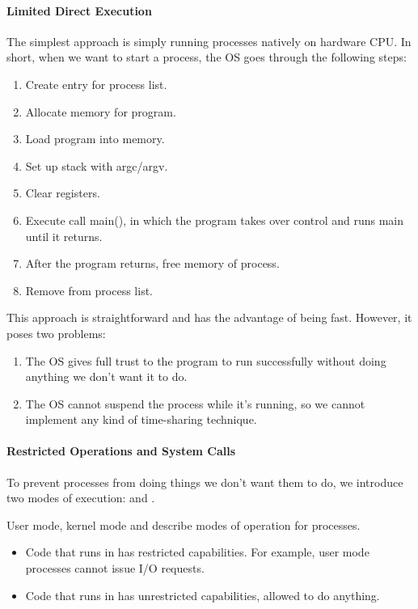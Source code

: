\paragraph{Limited Direct Execution}
The simplest approach is simply running processes natively on hardware CPU. In short, when we want to start a process, the OS goes through the following steps:
\begin{enumerate}[noitemsep]
    \item Create entry for process list.
    \item Allocate memory for program.
    \item Load program into memory.
    \item Set up stack with argc/argv.
    \item Clear registers.
    \item Execute call main(), in which the program takes over control and runs main until it returns.
    \item After the program returns, free memory of process.
    \item Remove from process list.
\end{enumerate}
This approach is straightforward and has the advantage of being fast. However, it poses two problems:
\begin{enumerate}
    \item The OS gives full trust to the program to run successfully without doing anything we don't want it to do.
    \item The OS cannot suspend the process while it's running, so we cannot implement any kind of time-sharing technique.
\end{enumerate}

\paragraph{Restricted Operations and System Calls}
To prevent processes from doing things we don't want them to do, we introduce two modes of execution:  and .

\begin{dfnbox}{User mode, kernel mode}{}
     and  describe modes of operation for processes.
    \begin{itemize}
        \item Code that runs in  has restricted capabilities. For example, user mode processes cannot issue I/O requests.
        \item Code that runs in  has unrestricted capabilities, allowed to do anything.
    \end{itemize}
\end{dfnbox}

